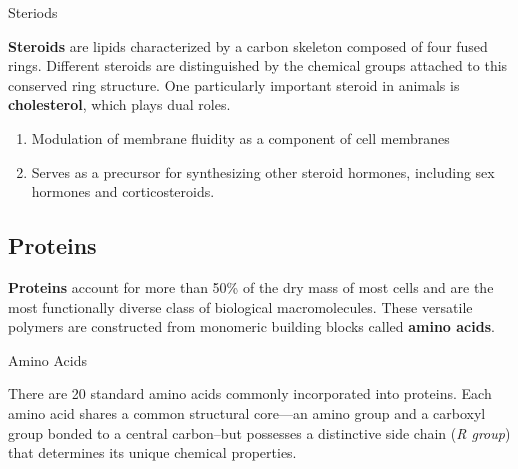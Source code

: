 \documentclass[10pt]{article}
\begin{document}
    \begin{core}{Steriods}

      \textbf{Steroids} are lipids characterized by a carbon skeleton composed of four fused rings. Different steroids are distinguished by the chemical groups attached to this conserved ring structure. One particularly important steroid in animals is \textbf{cholesterol}, which plays dual roles.

      \begin{enumerate}

        \item Modulation of membrane fluidity as a component of cell membranes

        \item Serves as a precursor for synthesizing other steroid hormones, including sex hormones and corticosteroids.

      \end{enumerate}


    \end{core}

  \subsection{Proteins}

    \textbf{Proteins} account for more than 50\% of the dry mass of most cells and are the most functionally diverse class of biological macromolecules. These versatile polymers are constructed from monomeric building blocks called \textbf{amino acids}.

    \begin{core}{Amino Acids}

      There are 20 standard amino acids commonly incorporated into proteins. Each amino acid shares a common structural core---an amino group and a carboxyl group bonded to a central carbon--but possesses a distinctive side chain (\textit{R group}) that determines its unique chemical properties.


    \end{core}
\end{document}
